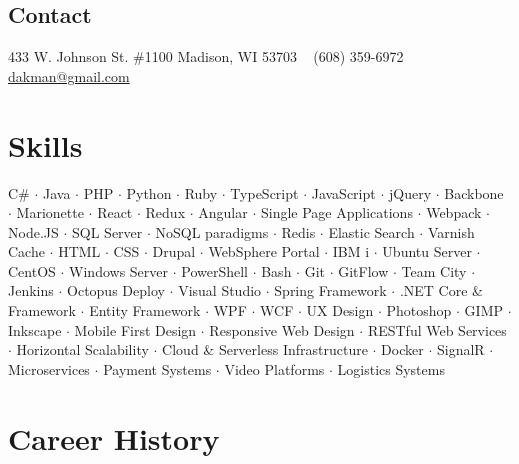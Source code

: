 \documentclass[]{clean-resume}
\begin{document}



\begin{aside}
  \section{Contact}
    433 W. Johnson St. \#1100
	Madison, WI 53703
    ~
    (608) 359-6972
    \href{mailto:dakman@gmail.com?subject=Resume}{dakman@gmail.com}
\end{aside}


\section{Skills}

\begin{centering}
{ \small
	C\# $\cdot$
	Java $\cdot$
	PHP $\cdot$
	Python $\cdot$
	Ruby $\cdot$
	TypeScript $\cdot$
	JavaScript $\cdot$
	jQuery $\cdot$
	Backbone $\cdot$
	Marionette $\cdot$
	React $\cdot$
	Redux $\cdot$
	Angular $\cdot$
	Single Page Applications $\cdot$
	Webpack $\cdot$
	Node.JS $\cdot$
	SQL Server $\cdot$
	NoSQL paradigms $\cdot$
	Redis $\cdot$
	Elastic Search $\cdot$
	Varnish Cache $\cdot$
	HTML $\cdot$
	CSS $\cdot$
	Drupal $\cdot$
	WebSphere Portal $\cdot$
	IBM i $\cdot$
	Ubuntu Server $\cdot$
	CentOS $\cdot$
	Windows Server $\cdot$
	PowerShell $\cdot$
	Bash $\cdot$
	Git $\cdot$
	GitFlow $\cdot$
	Team City $\cdot$
	Jenkins $\cdot$
	Octopus Deploy $\cdot$
	Visual Studio $\cdot$
	Spring Framework $\cdot$
	.NET Core \& Framework $\cdot$
	Entity Framework $\cdot$
	WPF $\cdot$
	WCF $\cdot$
	UX Design $\cdot$
	Photoshop $\cdot$
	GIMP $\cdot$
	Inkscape $\cdot$
	Mobile First Design $\cdot$
	Responsive Web Design $\cdot$
	RESTful Web Services $\cdot$
	Horizontal Scalability $\cdot$
	Cloud \& Serverless Infrastructure $\cdot$
	Docker $\cdot$
	SignalR $\cdot$
	Microservices $\cdot$
	Payment Systems $\cdot$
	Video Platforms $\cdot$
	Logistics Systems
}
\end{centering}

\section{Career History}
\end{document}
